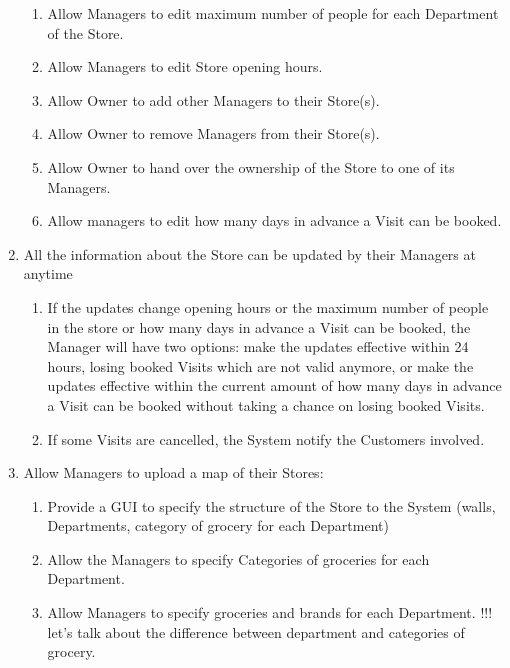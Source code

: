 \documentclass[a4paper, 10pt, oneside]{article}
\newcommand*{\lorenzo}[1]{\textcolor{BurntOrange}{#1}}
\begin{document}
\begin{enumerate}[align=left]
\begin{enumerate}[label={-}]
        \item \label{req:man:updateStoreInfo:maxPeoplePerDep}Allow Managers to edit maximum number of people for each Department of the Store.
        \item \label{req:man:updateStoreInfo:openingHours}Allow Managers to edit Store opening hours.
         \item \label{req:man:updateStoreInfo:addMan}Allow Owner to add other Managers to their Store(s).
        \item \label{req:man:updateStoreInfo:removeMan}Allow Owner to remove Managers from their Store(s).
        \item \label{req:man:updateStoreInfo:handOwnership}Allow Owner to hand over the ownership of the Store to one of its Managers.
        \item \label{req:man:updateStoreInfo:daysToBook}Allow managers to edit how many days in advance a Visit can be booked.
    \end{enumerate}
    
        \item \label{req:man:whenToUpdate}All the information about the Store can be updated by their Managers at anytime
    \begin{enumerate}[label={-}]
        \item \label{req:man:whenToUpdate:whenEffective}If the updates change opening hours or the maximum number of people in the store or how many days in advance a Visit can be booked, the Manager will have two options: make the updates effective within 24 hours, losing booked Visits which are not valid anymore, or make the updates effective within the current amount of how many days in advance a Visit can be booked without taking a chance on losing booked Visits.
        \item \label{req:man:whenToUpdate:lostVisits} If some Visits are cancelled, the System notify the Customers involved.
    \end{enumerate}
    
    \item \label{req:man:uploadMap}Allow Managers to upload a map of their Stores:
    \begin{enumerate}[label={-}]
        \item \label{req:man:uploadMap:GUI}Provide a GUI to specify the structure of the Store to the System (walls, Departments, category of grocery for each Department)
        \item \label{req:man:uploadMap:specCategories}Allow the Managers to specify Categories of groceries for each Department.
        \item \label{req:man:uploadMap:specInCategories}Allow Managers to specify groceries and brands for each Department. \lorenzo{!!! let's talk about the difference between department and categories of grocery.}
    \end{enumerate}
    

\end{enumerate}
\end{document}
